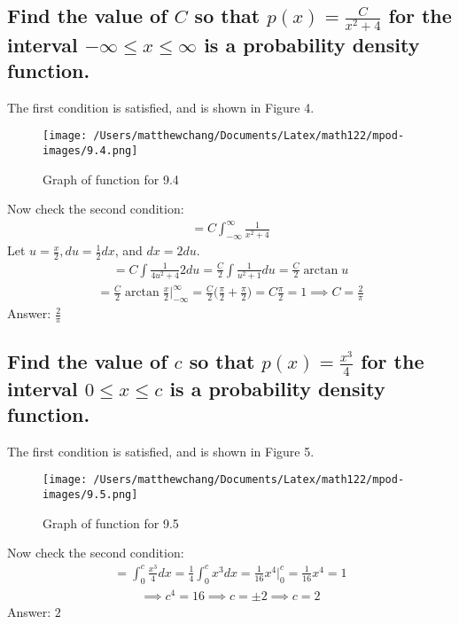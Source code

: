 \documentclass{article}
\begin{document}
\subsection{Find the value of $C$ so that $p(x)=\frac{C}{x^2 + 4}$ for the interval $-\infty \leq x \leq \infty$ is a probability density function.}
The first condition is satisfied, and is shown in Figure 4. 
\begin{figure}
	\centering
	\texttt{[image: /Users/matthewchang/Documents/Latex/math122/mpod-images/9.4.png]}
	\caption{Graph of function for 9.4}
\end{figure}
Now check the second condition:
\begin{align*}
	= C \int_{-\infty}^{\infty}{\frac{1}{x^2 + 4}}
\end{align*}
Let $u = \frac{x}{2}, du = \frac{1}{2} dx$, and $dx = 2du$.
\begin{align*}
	= C \int{\frac{1}{4u^2 + 4}2du} = \frac{C}{2} \int{\frac{1}{u^2 + 1}du} = \frac{C}{2} \arctan{u}
\end{align*}
\begin{align*}
	= \frac{C}{2} \arctan{\frac{x}{2}} \bigg|_{-\infty}^{\infty} = \frac{C}{2} \bigg( \frac{\pi}{2} + \frac{\pi}{2} \bigg) = C \frac{\pi}{2} = 1 \implies C = \frac{2}{\pi}
\end{align*}
Answer: $\frac{2}{\pi}$

\subsection{Find the value of $c$ so that $p(x)=\frac{x^3}{4}$ for the interval $0 \leq x \leq c$ is a probability density function.}
The first condition is satisfied, and is shown in Figure 5. 
\begin{figure}
	\centering
	\texttt{[image: /Users/matthewchang/Documents/Latex/math122/mpod-images/9.5.png]}
	\caption{Graph of function for 9.5}
\end{figure}
Now check the second condition:
\begin{align*}
	= \int_0^c{\frac{x^3}{4}dx} = \frac{1}{4} \int_0^c{x^3 dx} = \frac{1}{16} x^4 \bigg|_0^c = \frac{1}{16}x^4 = 1 
\end{align*}
\begin{align*}
	\implies c^4 = 16 \implies c = \pm 2 \implies c = 2
\end{align*}
Answer: $2$

\end{document}
